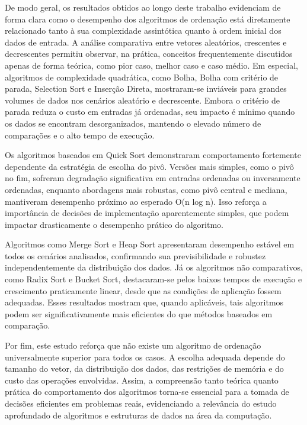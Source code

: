 \documentclass[12pt]{article}
\begin{document}
De modo geral, os resultados obtidos ao longo deste trabalho evidenciam de forma clara como o desempenho dos algoritmos de ordenação está diretamente relacionado tanto à sua complexidade assintótica quanto à ordem inicial dos dados de entrada. A análise comparativa entre vetores aleatórios, crescentes e decrescentes permitiu observar, na prática, conceitos frequentemente discutidos apenas de forma teórica, como pior caso, melhor caso e caso médio. Em especial, algoritmos de complexidade quadrática, como Bolha, Bolha com critério de parada, Selection Sort e Inserção Direta, mostraram-se inviáveis para grandes volumes de dados nos cenários aleatório e decrescente. Embora o critério de parada reduza o custo em entradas já ordenadas, seu impacto é mínimo quando os dados se encontram desorganizados, mantendo o elevado número de comparações e o alto tempo de execução.

Os algoritmos baseados em Quick Sort demonstraram comportamento fortemente dependente da estratégia de escolha do pivô. Versões mais simples, como o pivô no fim, sofreram degradação significativa em entradas ordenadas ou inversamente ordenadas, enquanto abordagens mais robustas, como pivô central e mediana, mantiveram desempenho próximo ao esperado O(n log n). Isso reforça a importância de decisões de implementação aparentemente simples, que podem impactar drasticamente o desempenho prático do algoritmo.

Algoritmos como Merge Sort e Heap Sort apresentaram desempenho estável em todos os cenários analisados, confirmando sua previsibilidade e robustez independentemente da distribuição dos dados. Já os algoritmos não comparativos, como Radix Sort e Bucket Sort, destacaram-se pelos baixos tempos de execução e crescimento praticamente linear, desde que as condições de aplicação fossem adequadas. Esses resultados mostram que, quando aplicáveis, tais algoritmos podem ser significativamente mais eficientes do que métodos baseados em comparação.

Por fim, este estudo reforça que não existe um algoritmo de ordenação universalmente superior para todos os casos. A escolha adequada depende do tamanho do vetor, da distribuição dos dados, das restrições de memória e do custo das operações envolvidas. Assim, a compreensão tanto teórica quanto prática do comportamento dos algoritmos torna-se essencial para a tomada de decisões eficientes em problemas reais, evidenciando a relevância do estudo aprofundado de algoritmos e estruturas de dados na área da computação.



\end{document}
